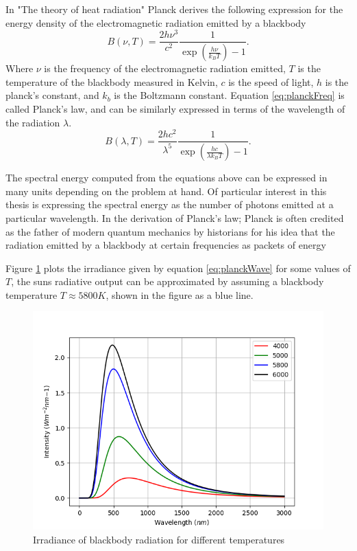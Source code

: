 In "The theory of heat radiation" Planck derives the following expression for the energy density of the electromagnetic radiation emitted by a blackbody
\begin{equation}\label{eq:planckFreq}
    B(\nu, T) = \frac{2 h \nu^3}{c^2} \frac{1}{\exp(\frac{h \nu}{k_B T}) - 1}.
\end{equation}
Where $\nu$ is the frequency of the electromagnetic radiation emitted, $T$ is the temperature of the blackbody measured in Kelvin, $c$ is the speed of light, $h$ is the planck's constant, and $k_b$ is the Boltzmann constant. Equation \eqref{eq:planckFreq} is called Planck's law, and can be similarly expressed in terms of the wavelength of the radiation $\lambda$.
\begin{equation}\label{eq:planckWave}
    B(\lambda, T) = \frac{2 h c^2}{\lambda^5} \frac{1}{\exp(\frac{hc}{\lambda k_B T}) - 1}.
\end{equation}

The spectral energy computed from the equations above can be expressed in many units depending on the problem at hand. Of particular interest in this thesis is expressing the spectral energy as the number of photons emitted at a particular wavelength. In the derivation of Planck's law; Planck is often credited as the father of modern quantum mechanics by historians for his idea that the radiation emitted by a blackbody at certain frequencies as packets of energy 

Figure \ref{fig:blackbody} plots the irradiance given by equation \eqref{eq:planckWave} for some values of $T$, the suns radiative output can be approximated by assuming a blackbody temperature $T \approx 5800 K$, shown in the figure as a blue line.

\begin{figure}[h!]
    \centering
    \includegraphics[scale=0.6]{figures/ReferenceFigures/blackbody.png}
    \caption{Irradiance of blackbody radiation for different temperatures}
    \label{fig:blackbody}
\end{figure}

